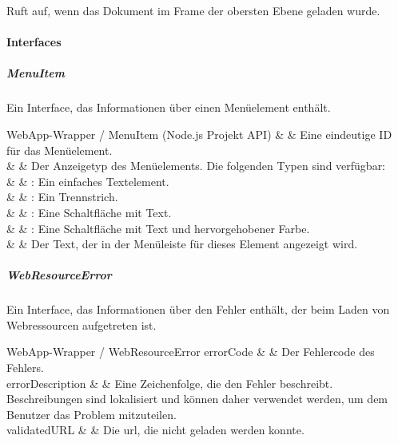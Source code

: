 Ruft  auf, wenn das Dokument im Frame der obersten Ebene geladen wurde.


\newpage

\paragraph{Interfaces}


\subparagraph{MenuItem}

Ein Interface, das Informationen über einen Menüelement enthält.

\begin{interfacedesc}{WebApp-Wrapper / MenuItem (Node.js Projekt API)}
     &  & Eine eindeutige ID für das Menüelement. \\ \hline
   &  & Der Anzeigetyp des Menüelements. Die folgenden Typen sind verfügbar: \\
              &                           & \textbf{}: Ein einfaches Textelement. \\
              &                           & \textbf{}: Ein Trennstrich. \\
              &                           & \textbf{}: Eine Schaltfläche mit Text. \\
              &                           & \textbf{}: Eine Schaltfläche mit Text und hervorgehobener Farbe. \\ \hline
   &  & Der Text, der in der Menüleiste für dieses Element angezeigt wird. \\ \hline
\end{interfacedesc}

\subparagraph{WebResourceError}

Ein Interface, das Informationen über den Fehler enthält, der beim Laden von Webressourcen aufgetreten ist.

\begin{interfacedesc}{WebApp-Wrapper / WebResourceError}
  errorCode         &  & Der Fehlercode des Fehlers. \\ \hline
  errorDescription  &  & Eine Zeichenfolge, die den Fehler beschreibt. Beschreibungen sind lokalisiert und können daher verwendet werden, um dem Benutzer das Problem mitzuteilen. \\ \hline
  validatedURL      &  & Die \ac{url}, die nicht geladen werden konnte. \\ \hline
\end{interfacedesc}
